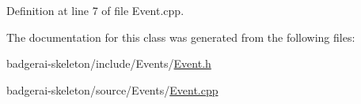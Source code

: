 Definition at line 7 of file Event.\-cpp.


\begin{DoxyCode}
{
}
\end{DoxyCode}


The documentation for this class was generated from the following files\-:\begin{DoxyCompactItemize}
\item 
badgerai-\/skeleton/include/\-Events/\hyperlink{Event_8h}{Event.\-h}\item 
badgerai-\/skeleton/source/\-Events/\hyperlink{Event_8cpp}{Event.\-cpp}\end{DoxyCompactItemize}

